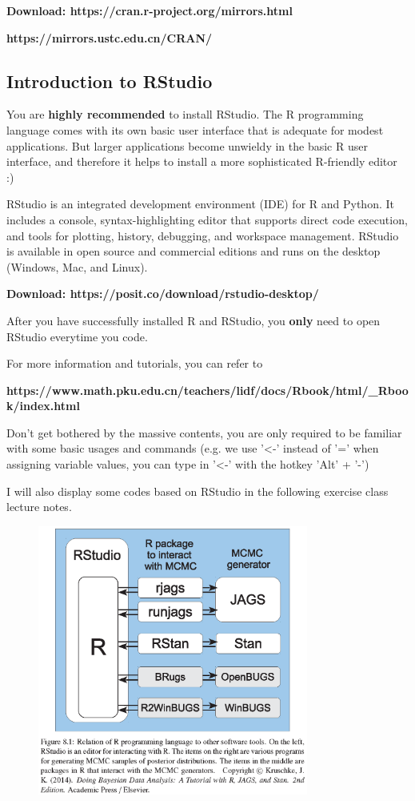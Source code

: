 \documentclass[cn,hazy,green,12pt,normal]{elegantnote}
\numberwithin{equation}{section}
\numberwithin{subsection}{section}
\begin{document}
\textbf{Download: https://cran.r-project.org/mirrors.html}
\vspace*{-1em}

\hspace{4.7em} \textbf{https://mirrors.ustc.edu.cn/CRAN/}
\subsection{Introduction to RStudio}
You are \textbf{highly recommended} to install RStudio. The R programming language comes with its own basic user interface that is adequate for modest applications. But larger applications become unwieldy in the basic R user
interface, and therefore it helps to install a more sophisticated R-friendly editor \, :)

RStudio is an integrated development environment (IDE) for R and Python. It includes a console, syntax-highlighting editor that supports direct code execution, and tools for plotting, history, debugging, and workspace management. RStudio is available in open source and commercial editions and runs on the desktop (Windows, Mac, and Linux).

\textbf{Download: https://posit.co/download/rstudio-desktop/} 

After you have successfully installed R and RStudio, you \textbf{only} need to open RStudio everytime you code.

For more information and tutorials, you can refer to
\vspace{-1em}

\hspace{-2em}\textbf{https://www.math.pku.edu.cn/teachers/lidf/docs/Rbook/html/\_Rbook/index.html}

Don't get bothered by the massive contents, you are only required to be familiar with some basic usages and 
commands (e.g. we use '<-' instead of '=' when assigning variable values, you can type in '<-' with the hotkey 
'Alt' + '-')

I will also display some codes based on RStudio in the following exercise class lecture notes.
\begin{example}
    \begin{figure}[!htbp]
    \centering
    \includegraphics[width=24em]{./image/image_1.png}
    \label{image_1}
\end{figure}
\end{example}
\end{document}
